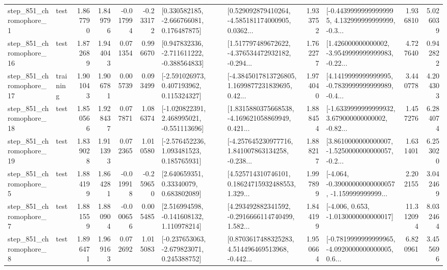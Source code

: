 \begin{tabular}{llrrrrllrlrr}
   step\_851\_chromophore\_1 &      test &      1.867790 &    1.849796 &     -0.017994 & -0.233172 &    [0.330582185, -2.666766081, 0.176487875] &  [0.529092879410264, -4.585181174000905, 0.0362... &       1.933752 &  [-0.44399999999999995, 4.132999999999999, -0.3... &            1.936810 &          5.026039 \\
  step\_851\_chromophore\_16 &      test &      1.872689 &    1.944043 &      0.071354 &  0.996670 &   [0.947832336, -2.711611222, -0.388564833] &  [1.517797489672622, -4.376534472932182, -0.294... &       1.762277 &  [1.426000000000002, -3.9549999999999983, -0.22... &            4.727640 &          0.942822 \\
  step\_851\_chromophore\_17 &  training &      1.901043 &    1.906781 &      0.005739 &  0.093499 &    [-2.591026973, 0.407193962, 0.115324327] &  [-4.3845017813726805, 1.1699877231839695, 0.42... &       1.974040 &  [4.1419999999999995, -0.7839999999999989, -0.4... &            3.440778 &          4.204303 \\
  step\_851\_chromophore\_18 &      test &      1.850566 &    1.928437 &      0.077871 &  1.086374 &   [-1.020822391, 2.468995021, -0.551113696] &  [1.8315880375668538, -4.169621058869949, 0.421... &       1.888454 &  [-1.6339999999999932, 3.679000000000002, -0.82... &            1.457276 &          6.284074 \\
  step\_851\_chromophore\_19 &      test &      1.839028 &    1.911393 &      0.072365 &  1.010580 &    [-2.576452236, 1.093481523, 0.185765931] &  [-4.257645230977716, 1.841007863134258, -0.238... &       1.888217 &  [3.8610000000000007, -1.5250000000000057, -0.2... &            1.631401 &          6.253020 \\
   step\_851\_chromophore\_5 &      test &      1.884199 &    1.864281 &     -0.019918 & -0.259650 &      [2.640659351, 0.33340079, 0.683802089] &  [4.525714310746101, 0.18624715932488553, 1.329... &       1.997899 &  [-4.064, -0.39000000000000057, -1.159999999999... &            2.202155 &          3.042469 \\
   step\_851\_chromophore\_7 &      test &      1.881559 &    1.880904 &     -0.000656 &  0.005485 &    [2.516994598, -0.141608132, 1.110978214] &  [4.293492882341592, -0.2916666114740499, 1.582... &       1.844199 &               [-4.006, 0.653, -1.0130000000000017] &           11.312094 &          8.032464 \\
   step\_851\_chromophore\_8 &      test &      1.896471 &    1.969163 &      0.072692 &  1.015083 &   [-0.237653063, -2.679823071, 0.245388752] &  [0.8703617488325283, 4.514496469513968, -0.442... &       1.950664 &  [-0.7819999999999965, -4.0920000000000005, 0.6... &            6.820961 &          3.455696 \\

\end{tabular}
